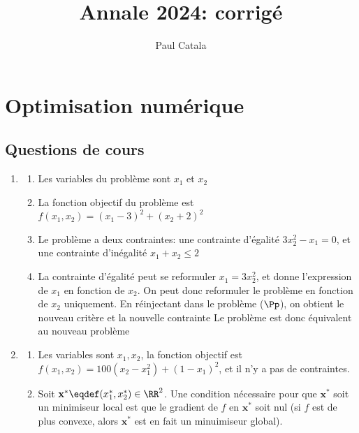 \documentclass{article}
\title{Annale 2024: corrigé}
\date{}
\author{Paul Catala}
\begin{document}
\maketitle

\section{Optimisation numérique}

\subsection{Questions de cours}

\begin{enumerate}
	\item 
	\begin{enumerate}
		\item Les variables du problème sont $x_1$ et $x_2$
		\item La fonction objectif du problème est $f(x_1,x_2) = (x_1-3)^2 + (x_2+2)^2$
		\item Le problème a deux contraintes: une contrainte d'égalité $3x_2^2-x_1=0$, et une contrainte d'inégalité $x_1+x_2 \leq 2$
		\item La contrainte d'égalité peut se reformuler $x_1 = 3x_2^2$, et donne l'expression de $x_1$ en fonction de $x_2$. On peut donc reformuler le problème en fonction de $x_2$ uniquement. En réinjectant dans le problème ($\Pp$), on obtient le nouveau critère
		et la nouvelle contrainte
		Le problème est donc équivalent au nouveau problème
	\end{enumerate}
	
	\item \begin{enumerate}
		\item Les variables sont $x_1,x_2$, la fonction objectif est $f(x_1,x_2) = 100(x_2-x_1^2)+(1-x_1)^2$, et il n'y a pas de contraintes.
		\item Soit $\mathbf{x}^* \eqdef (x_1^*,x_2^*) \in \RR^2$. Une condition nécessaire pour que $\mathbf{x}^*$ soit un minimiseur local est que le gradient de $f$ en $\mathbf{x}^*$ soit nul (si $f$ est de plus convexe, alors $\mathbf{x}^*$ est en fait un minuimiseur global).
		

\end{enumerate}
\end{enumerate}
\end{document}
